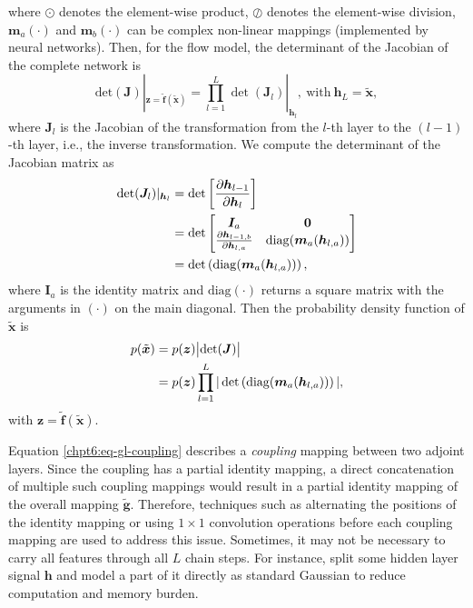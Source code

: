 where $\odot$ denotes the element-wise product, $\oslash$ denotes
the element-wise division, $\bm{m}_a(\cdot)$ and $\bm{m}_b(\cdot)$ can be
complex non-linear mappings (implemented by neural networks).
Then, for the flow model, the determinant of the Jacobian of the complete network is
\begin{equation}
  \mathrm{det}(\bm{J}) |_{\bm{z}=\tilde{\bm{f}}(\tilde{\bm{x}})} = \prod_{l=1}^L \det (\bm{J}_l) |_{\bm{h}_{l}}, ~\mathrm{with}~ \bm{h}_L = \tilde{\bm{x}},
\end{equation}
where $\bm{J}_l$ is the Jacobian of the transformation from the $l$-th layer to the $(l-1)$-th layer, i.e., the inverse transformation. We compute the determinant of the Jacobian matrix as
\begin{align}\label{eq-hl-determinate}
  \det (\bm{J}_l)|_{\bm{h}_{l}}& = \det \left[  \frac{ \partial \bm{h}_{l-1}}{\partial \bm{h}_l} \right] \nonumber\\
                               & = \det
                                 \begin{bmatrix}
                                   \bm{I}_a & \mathbf{0} \nonumber\\
                                   \frac{ \partial \bm{h}_{l-1,b}}{\partial \bm{h}_{l,a}} & \mathrm{diag}(\bm{m}_a(\bm{h}_{l,a}))
                                 \end{bmatrix}\nonumber\\
                               &= \det \left( \mathrm{diag}(\bm{m}_a(\bm{h}_{l,a})) \right),
\end{align}
where $\bm{I}_a$ is the identity matrix and $\mathrm{diag}(\cdot)$ returns a square matrix with the arguments in $(\cdot)$ on the main diagonal. Then the probability density function of $\tilde{\bm{x}}$ is
\begin{align}
  p(\tilde{\bm{x}}) & =  p(\bm{z}) \big| \mathrm{det}(\bm{J}) \big| \nonumber\\
                    &  = p(\bm{z}) \prod_{l=1}^L | \det\left( \mathrm{diag}(\bm{m}_a(\bm{h}_{l,a}))  \right) |,
\end{align}
with $\bm{z}=\tilde{\bm{f}}(\tilde{\bm{x}})$.

Equation \eqref{chpt6:eq-gl-coupling} describes a \textit{coupling} mapping between two adjoint layers. Since the coupling has a partial identity mapping, a direct concatenation of multiple such coupling mappings would result in a partial identity mapping of the overall mapping $\tilde{\bm{g}}$. Therefore, techniques such as alternating the positions of the identity mapping \cite{2016arXiv160508803D} or using $1\times1$ convolution operations before each coupling mapping \cite{2018arXiv180703039K} are used to address this issue.
Sometimes, it may not be necessary to carry all features through all $L$ chain steps. For instance, \cite{2016arXiv160508803D}\cite{2018arXiv180703039K} split some hidden
layer signal $\bm{h}$ and model a part of it directly as standard Gaussian to reduce computation and memory burden.

